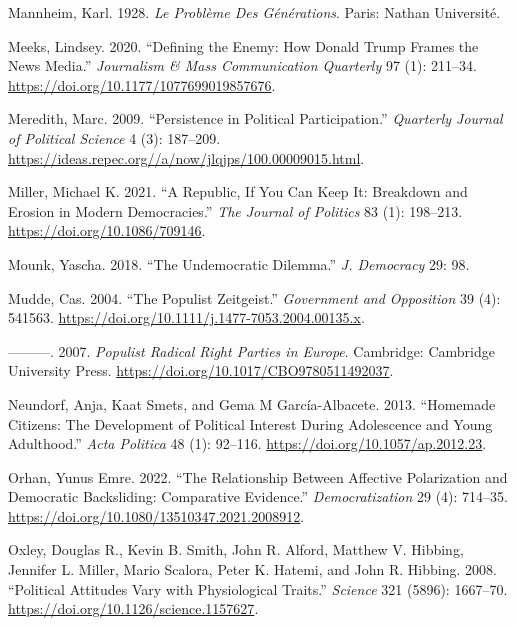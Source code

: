 \documentclass[
  10pt,
  letterpaper,
  DIV=11,
  numbers=noendperiod]{scrartcl}
\newlength{\cslhangindent}
\newenvironment{CSLReferences}[2] %
 {\begin{list}{}{%
  \setlength{\itemindent}{0pt}
  \setlength{\leftmargin}{0pt}
  \setlength{\parsep}{0pt}
  \ifodd #1
   \setlength{\leftmargin}{\cslhangindent}
   \setlength{\itemindent}{-1\cslhangindent}
  \fi
  \setlength{\itemsep}{#2\baselineskip}}}
 {\end{list}}
\begin{document}
\begin{CSLReferences}{1}{0}
Mannheim, Karl. 1928. \emph{Le Problème Des Générations}. Paris: Nathan
Université.

Meeks, Lindsey. 2020. {``Defining the Enemy: How Donald Trump Frames the
News Media.''} \emph{Journalism \& Mass Communication Quarterly} 97 (1):
211--34. \url{https://doi.org/10.1177/1077699019857676}.

Meredith, Marc. 2009. {``Persistence in Political Participation.''}
\emph{Quarterly Journal of Political Science} 4 (3): 187--209.
\url{https://ideas.repec.org//a/now/jlqjps/100.00009015.html}.

Miller, Michael K. 2021. {``A Republic, If You Can Keep It: Breakdown
and Erosion in Modern Democracies.''} \emph{The Journal of Politics} 83
(1): 198--213. \url{https://doi.org/10.1086/709146}.

Mounk, Yascha. 2018. {``The Undemocratic Dilemma.''} \emph{J. Democracy}
29: 98.

Mudde, Cas. 2004. {``The Populist Zeitgeist.''} \emph{Government and
Opposition} 39 (4): 541563.
\url{https://doi.org/10.1111/j.1477-7053.2004.00135.x}.

---------. 2007. \emph{Populist Radical Right Parties in Europe}.
Cambridge: Cambridge University Press.
\url{https://doi.org/10.1017/CBO9780511492037}.

Neundorf, Anja, Kaat Smets, and Gema M García-Albacete. 2013.
{``Homemade Citizens: The Development of Political Interest During
Adolescence and Young Adulthood.''} \emph{Acta Politica} 48 (1):
92--116. \url{https://doi.org/10.1057/ap.2012.23}.

Orhan, Yunus Emre. 2022. {``The Relationship Between Affective
Polarization and Democratic Backsliding: Comparative Evidence.''}
\emph{Democratization} 29 (4): 714--35.
\url{https://doi.org/10.1080/13510347.2021.2008912}.

Oxley, Douglas R., Kevin B. Smith, John R. Alford, Matthew V. Hibbing,
Jennifer L. Miller, Mario Scalora, Peter K. Hatemi, and John R. Hibbing.
2008. {``Political Attitudes Vary with Physiological Traits.''}
\emph{Science} 321 (5896): 1667--70.
\url{https://doi.org/10.1126/science.1157627}.


\end{CSLReferences}
\end{document}
